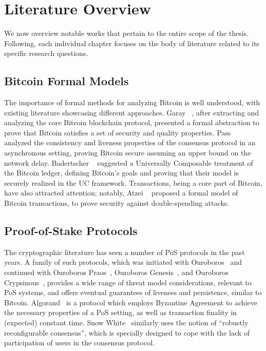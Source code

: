 \section{Literature Overview}\label{sec:related}

We now overview notable works that pertain to the entire scope of the thesis.
Following, each individual chapter focuses on the body of literature related to
its specific research questions.

\subsection{Bitcoin Formal Models}
The importance of formal methods for analyzing Bitcoin is well understood, with
existing literature showcasing different approaches. Garay
\etal~\cite{EC:GarKiaLeo15,C:GarKiaLeo17}, after extracting and analyzing the
core Bitcoin blockchain protocol, presented a formal abstraction to prove that
Bitcoin satisfies a set of security and quality properties. Pass
\etal~\cite{EC:PasSeeShe17} analyzed the consistency and liveness properties of
the consensus protocol in an asynchronous setting, proving Bitcoin secure
assuming an upper bound on the network delay. Badertscher \etal~\cite{C:BMTZ17}
suggested a Universally Composable treatment of the Bitcoin ledger, defining
Bitcoin's goals and proving that their model is securely realized in the UC
framework. Transactions, being a core part of Bitcoin, have also attracted
attention; notably, Atzei \etal~\cite{FC:ABLZ18} proposed a formal model of
Bitcoin transactions, to prove security \eg against double-spending attacks.

\subsection{Proof-of-Stake Protocols}
The cryptographic literature has seen a number of PoS protocols in the past
years. A family of such protocols, which was initiated with
Ouroboros~\cite{C:KRDO17} and continued with Ouroboros Praos~\cite{EC:DGKR18},
Ouroboros Genesis~\cite{CCS:BGKRZ18}, and Ouroboros
Crypsinous~\cite{SP:KKKZ19}, provides a wide range of threat model
considerations, relevant to PoS systems, and offers eventual guarantees of
liveness and persistence, similar to Bitcoin.
Algorand~\cite{EPRINT:CGMV18,EPRINT:GHMVZ17} is a protocol which employs
Byzantine Agreement to achieve the necessary properties of a PoS setting, as
well as transaction finality in (expected) constant time. Snow
White~\cite{FC:DaiPasShi19,AC:PasShi17} similarly uses the notion of
``robustly reconfigurable consensus'', which is specially designed to cope with
the lack of participation of users in the consensus protocol.

